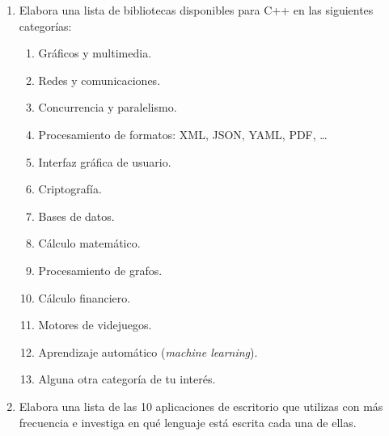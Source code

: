 \begin{enumerate}
\item Elabora una lista de bibliotecas disponibles para C++ en las siguientes
      categorías:
\begin{enumerate}
  \item Gráficos y multimedia.
  \item Redes y comunicaciones.
  \item Concurrencia y paralelismo.
  \item Procesamiento de formatos: XML, JSON, YAML, PDF, \ldots
  \item Interfaz gráfica de usuario.
  \item Criptografía.
  \item Bases de datos.
  \item Cálculo matemático.
  \item Procesamiento de grafos.
  \item Cálculo financiero.
  \item Motores de videjuegos.
  \item Aprendizaje automático (\emph{machine learning}).
  \item Alguna otra categoría de tu interés.
\end{enumerate}

\item Elabora una lista de las 10 aplicaciones de escritorio que utilizas con más 
      frecuencia e investiga en qué lenguaje está escrita cada una de ellas.

\end{enumerate}
